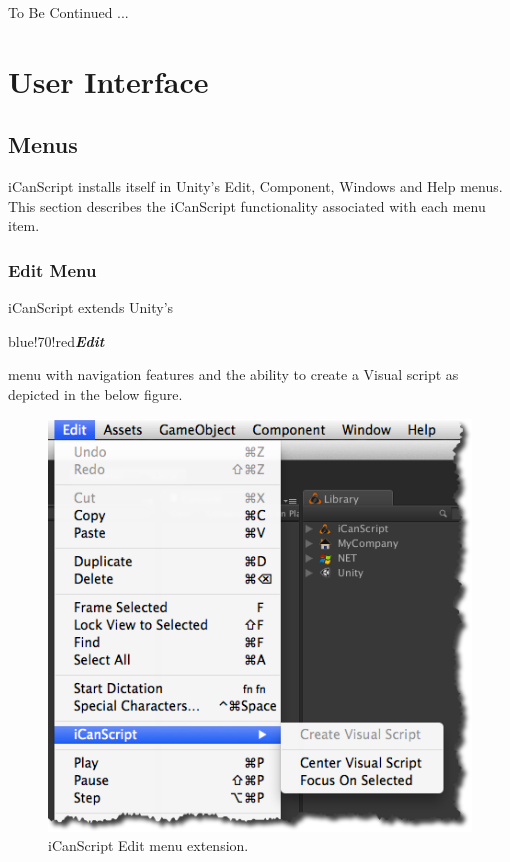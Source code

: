 \begin{tipbox}


{\Large \color{black} To Be Continued ... }

\end{tipbox}


\pagebreak 

\part{User Interface}
\label{userinterface}

\chapter{Menus}
\label{menus}

iCanScript installs itself in Unity's Edit, Component, Windows and Help menus. This section describes the iCanScript functionality associated with each menu item.

\section{Edit Menu}
\label{editmenu}

iCanScript extends Unity's \begin{color}{blue!70!red}\emph{\textbf{Edit}}\end{color} menu with navigation features and the ability to create a Visual script as depicted in the below figure.

\begin{figure}[htbp]
\centering
\includegraphics[keepaspectratio,width=\textwidth,height=0.75\textheight]{ics-menu-edit.png}
\caption{iCanScript Edit menu extension.}
\label{ics-menu-edit.png}
\end{figure}

